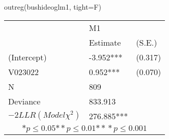 \begin{Schunk}
\begin{Sinput}
 outreg(bushideoglm1, tight=F)
\end{Sinput}
\begin{tabular}{*{3}{l}}
\hline
     & \multicolumn{2}{l}{ M1}\tabularnewline
      & Estimate  & (S.E.) \tabularnewline
 \hline
 \hline
  (Intercept)    &-3.952*** &   (0.317) \tabularnewline
  V023022    &0.952*** &   (0.070) \tabularnewline
 \hline
 N & 809 &  \tabularnewline
   Deviance         &833.913         & \tabularnewline
 $-2LLR (Model \chi^2)$  &   276.885*** &   \tabularnewline
 \hline
\hline
 
 \multicolumn{3}{c}{${*  p}\le 0.05$${*\!\!*  p}\le 0.01$${*\!\!*\!\!*  p}\le 0.001$}\tabularnewline
 \end{tabular}\end{Schunk}
